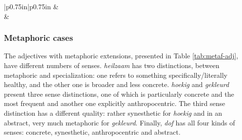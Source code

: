 \documentclass[
]{book}
\begin{document}
\begin{longtable}[c]{|p{0.75in}|p{0.75in}}
 &  \\





 &  \\

\noalign{\global\setlength{\arrayrulewidth}{2pt}}

\end{longtable}

\hypertarget{metaphoric-cases}{%
\subsubsection{Metaphoric cases}\label{metaphoric-cases}}

The adjectives with metaphoric extensions, presented in Table \ref{tab:metaf-adj}, have different numbers of senses. \emph{heilzaam} has two distinctions, between metaphoric and specialization: one refers to something specifically/literally healthy, and the other one is broader and less concrete. \emph{hoekig} and \emph{gekleurd} present three sense distinctions, one of which is particularly concrete and the most frequent and another one explicitly anthropocentric. The third sense distinction has a different quality: rather synesthetic for \emph{hoekig} and in an abstract, very much metaphoric for \emph{gekleurd}. Finally, \emph{dof} has all four kinds of senses: concrete, synesthetic, anthropocentric and abstract.

\providecommand{\docline}[3]{\noalign{\global\setlength{\arrayrulewidth}{#1}}\arrayrulecolor[HTML]{#2}\cline{#3}}
\end{document}
